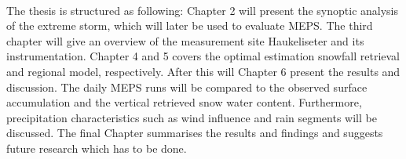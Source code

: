 \\
The thesis is structured as following: Chapter 2 will present the synoptic analysis of the extreme storm, which will later be used to evaluate MEPS. The third chapter will give an overview of the measurement site Haukeliseter and its instrumentation. Chapter 4 and 5 covers the optimal estimation snowfall retrieval and regional model, respectively. After this will Chapter 6 present the results and discussion. The daily MEPS runs will be compared to the observed surface accumulation and the vertical retrieved snow water content. Furthermore, precipitation characteristics such as wind influence and rain segments will be discussed. The final Chapter summarises the results and findings and suggests future research which has to be done. 

